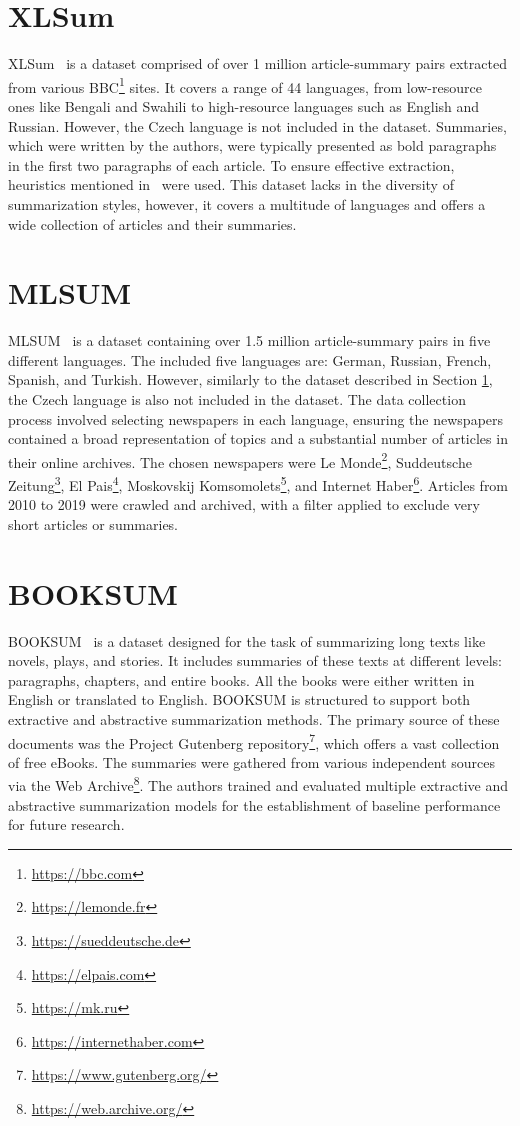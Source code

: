 \documentclass[english, ba, kiv, he, iso690numb, pdf, viewonly]{fasthesis}
\begin{document}
	\section{XLSum} \label{xlsum}
	XLSum~\cite{hasan-etal-2021-xl} is a dataset comprised of over 1 million article-summary pairs extracted from various BBC\footnote{\url{https://bbc.com}} sites. It covers a range of 44 languages, from low-resource ones like Bengali and Swahili to high-resource languages such as English and Russian. However, the Czech language is not included in the dataset. Summaries, which were written by the authors, were typically presented as bold paragraphs in the first two paragraphs of each article. To ensure effective extraction, heuristics mentioned in~\cite{hasan-etal-2021-xl} were used. This dataset lacks in the diversity of summarization styles, however, it covers a multitude of languages and offers a wide collection of articles and their summaries.
	
	\section{MLSUM}
	MLSUM~\cite{scialom2020mlsum} is a dataset containing over 1.5 million article-summary pairs in five different languages. The included five languages are: German, Russian, French, Spanish, and Turkish. However, similarly to the dataset described in Section \ref{xlsum}, the Czech language is also not included in the dataset. The data collection process involved selecting newspapers in each language, ensuring the newspapers contained a broad representation of topics and a substantial number of articles in their online archives. The chosen newspapers were Le Monde\footnote{\url{https://lemonde.fr}}, Suddeutsche Zeitung\footnote{\url{https://sueddeutsche.de}}, El Pais\footnote{\url{https://elpais.com}}, Moskovskij Komsomolets\footnote{\url{https://mk.ru}}, and Internet Haber\footnote{\url{https://internethaber.com}}. Articles from 2010 to 2019 were crawled and archived, with a filter applied to exclude very short articles or summaries.
	
	\section{BOOKSUM}
	BOOKSUM~\cite{kryscinski2021booksum} is a dataset designed for the task of summarizing long texts like novels, plays, and stories. It includes summaries of these texts at different levels: paragraphs, chapters, and entire books. All the books were either written in English or translated to English. BOOKSUM is structured to support both extractive and abstractive summarization methods. The primary source of these documents was the Project Gutenberg repository\footnote{\url{https://www.gutenberg.org/}}, which offers a vast collection of free eBooks. The summaries were gathered from various independent sources via the Web Archive\footnote{\url{https://web.archive.org/}}. The authors trained and evaluated multiple extractive and abstractive summarization models for the establishment of baseline performance for future research.
	
\end{document}
